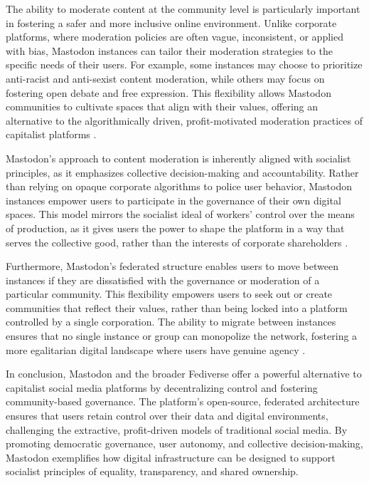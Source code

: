 \begin{refsection}
The ability to moderate content at the community level is particularly important in fostering a safer and more inclusive online environment. Unlike corporate platforms, where moderation policies are often vague, inconsistent, or applied with bias, Mastodon instances can tailor their moderation strategies to the specific needs of their users. For example, some instances may choose to prioritize anti-racist and anti-sexist content moderation, while others may focus on fostering open debate and free expression. This flexibility allows Mastodon communities to cultivate spaces that align with their values, offering an alternative to the algorithmically driven, profit-motivated moderation practices of capitalist platforms \cite[pp.~45-60]{smith2009}.

Mastodon’s approach to content moderation is inherently aligned with socialist principles, as it emphasizes collective decision-making and accountability. Rather than relying on opaque corporate algorithms to police user behavior, Mastodon instances empower users to participate in the governance of their own digital spaces. This model mirrors the socialist ideal of workers’ control over the means of production, as it gives users the power to shape the platform in a way that serves the collective good, rather than the interests of corporate shareholders \cite[pp.~120-136]{marx2018}.

Furthermore, Mastodon’s federated structure enables users to move between instances if they are dissatisfied with the governance or moderation of a particular community. This flexibility empowers users to seek out or create communities that reflect their values, rather than being locked into a platform controlled by a single corporation. The ability to migrate between instances ensures that no single instance or group can monopolize the network, fostering a more egalitarian digital landscape where users have genuine agency \cite[pp.~104-118]{robbins2020}.

In conclusion, Mastodon and the broader Fediverse offer a powerful alternative to capitalist social media platforms by decentralizing control and fostering community-based governance. The platform’s open-source, federated architecture ensures that users retain control over their data and digital environments, challenging the extractive, profit-driven models of traditional social media. By promoting democratic governance, user autonomy, and collective decision-making, Mastodon exemplifies how digital infrastructure can be designed to support socialist principles of equality, transparency, and shared ownership.


\end{refsection}

